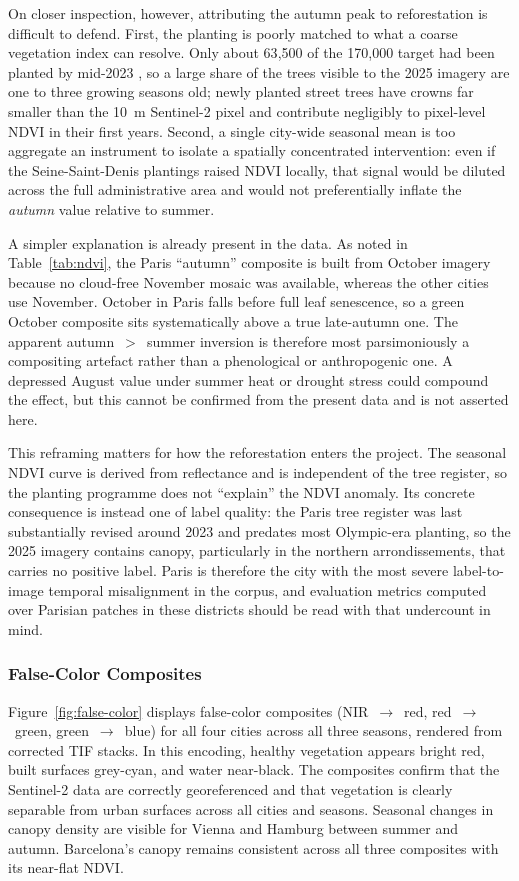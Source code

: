On closer inspection, however, attributing the autumn peak to reforestation is difficult to defend. First, the planting is poorly matched to what a coarse vegetation index can resolve. Only about 63{,}500 of the 170{,}000 target had been planted by mid-2023 \cite{euronewsgreen2023}, so a large share of the trees visible to the 2025 imagery are one to three growing seasons old; newly planted street trees have crowns far smaller than the 10~m Sentinel-2 pixel and contribute negligibly to pixel-level NDVI in their first years. Second, a single city-wide seasonal mean is too aggregate an instrument to isolate a spatially concentrated intervention: even if the Seine-Saint-Denis plantings raised NDVI locally, that signal would be diluted across the full administrative area and would not preferentially inflate the \emph{autumn} value relative to summer.

A simpler explanation is already present in the data. As noted in Table~\ref{tab:ndvi}, the Paris ``autumn'' composite is built from October imagery because no cloud-free November mosaic was available, whereas the other cities use November. October in Paris falls before full leaf senescence, so a green October composite sits systematically above a true late-autumn one. The apparent autumn~$>$~summer inversion is therefore most parsimoniously a compositing artefact rather than a phenological or anthropogenic one. A depressed August value under summer heat or drought stress could compound the effect, but this cannot be confirmed from the present data and is not asserted here.

This reframing matters for how the reforestation enters the project. The seasonal NDVI curve is derived from reflectance and is independent of the tree register, so the planting programme does not ``explain'' the NDVI anomaly. Its concrete consequence is instead one of label quality: the Paris tree register was last substantially revised around 2023 and predates most Olympic-era planting, so the 2025 imagery contains canopy, particularly in the northern arrondissements, that carries no positive label. Paris is therefore the city with the most severe label-to-image temporal misalignment in the corpus, and evaluation metrics computed over Parisian patches in these districts should be read with that undercount in mind.

\subsubsection{False-Color Composites}
\label{sec:false-color-composites}
Figure~\ref{fig:false-color} displays false-color composites (NIR~$\to$~red, red~$\to$~green, green~$\to$~blue) for all four cities across all three seasons, rendered from corrected TIF stacks. In this encoding, healthy vegetation appears bright red, built surfaces grey-cyan, and water near-black. The composites confirm that the Sentinel-2 data are correctly georeferenced and that vegetation is clearly separable from urban surfaces across all cities and seasons. Seasonal changes in canopy density are visible for Vienna and Hamburg between summer and autumn. Barcelona's canopy remains consistent across all three composites with its near-flat NDVI.

